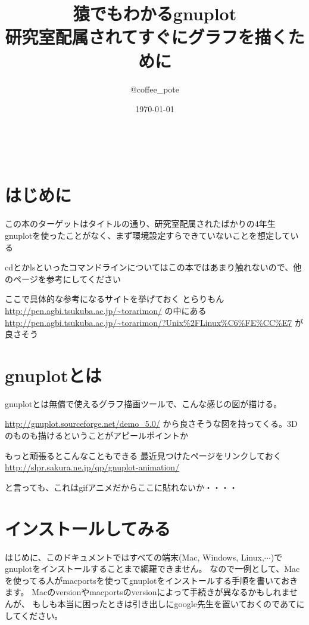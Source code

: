 \documentclass[12pt,a4paper]{jarticle}
\begin{document}
\title{猿でもわかるgnuplot\\
研究室配属されてすぐにグラフを描くために}
\author{@coffee\_pote} 
\date{\today}

\maketitle
\tableofcontents　　　　　　%
\newpage


\section{はじめに}
この本のターゲットはタイトルの通り、研究室配属されたばかりの4年生
gnuplotを使ったことがなく、まず環境設定すらできていないことを想定している

cdとかlsといったコマンドラインについてはこの本ではあまり触れないので、他のページを参考にしてください

ここで具体的な参考になるサイトを挙げておく
とらりもん\url{http://pen.agbi.tsukuba.ac.jp/~torarimon/}
の中にある
\url{http://pen.agbi.tsukuba.ac.jp/~torarimon/?Unix%2FLinux%C6%FE%CC%E7}
が良さそう

\section{gnuplotとは}
gnuplotとは無償で使えるグラフ描画ツールで、こんな感じの図が描ける。

\url{http://gnuplot.sourceforge.net/demo_5.0/}
から良さそうな図を持ってくる。3Dのものも描けるということがアピールポイントか


もっと頑張るとこんなこともできる
最近見つけたページをリンクしておく
\url{http://slpr.sakura.ne.jp/qp/gnuplot-animation/}

と言っても、これはgifアニメだからここに貼れないか・・・・


\section{インストールしてみる}
はじめに、このドキュメントではすべての端末(Mac, Windows, Linux,$\cdots$)でgnuplotをインストールすることまで網羅できません。
なので一例として、Macを使ってる人がmacportsを使ってgnuplotをインストールする手順を書いておきます。
Macのversionやmacportsのversionによって手続きが異なるかもしれませんが、
もしも本当に困ったときは引き出しにgoogle先生を置いておくのであてにしてください。
\end{document}
